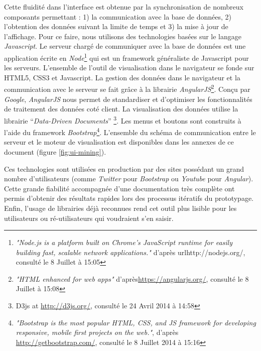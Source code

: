     Cette fluidité dans l'interface est obtenue par la  synchronisation de nombreux composants permettant : 1) la communication avec la base de données, 2) l'obtention des données suivant la limite de temps et 3) la mise à jour de l'affichage. Pour ce faire, nous utilisons des technologies basées sur le langage \textit{Javascript}. Le serveur chargé de communiquer avec la base de données est une application écrite en \textit{Node}\footnote{ \textit{"Node.js is a platform built on Chrome's JavaScript runtime for easily building fast, scalable network applications."} d'après url{http://nodejs.org/}, consulté le 8 Juillet à 15:05} qui est un framework généraliste de Javascript pour les serveurs. L{\textquoteright}ensemble de l{\textquoteright}outil de visualisation dans le navigateur se fonde sur HTML5, CSS3 et Javascript. La gestion des données dans le navigateur et la communication avec le serveur se fait grâce à la librairie \textit{AngularJS}\footnote{\textit{"HTML enhanced for web apps"} d'après\url{https://angularjs.org/}, consulté le 8 Juillet à 15:08}. Conçu par \textit{Google}, \textit{AngularJS} nous permet de standardiser et d'optimiser les fonctionnalités de traitement des données coté client. La visualisation des données utilise la librairie {\textquotedblleft}\textit{Data-Driven Documents}{\textquotedblright} \citep{Bostock2011}\footnote{ D3js at \url{http://d3js.org/,} consulté le 24 Avril 2014 à 14:58}. Les menus et boutons sont construits à l'aide du framework \textit{Bootstrap}\footnote{\textit{"Bootstrap is the most popular HTML, CSS, and JS framework for developing responsive, mobile first projects on the web."}, d'après \url{http://getbootstrap.com/}, consulté le 8 Juillet 2014 à 15:16}. L'ensemble du schéma de communication entre le serveur et le moteur de visualisation est disponibles dans les annexes de ce document (figure \ref{fig:ui-mining}).

    Ces technologies sont utilisées en production par des sites possédant un grand nombre d'utilisateurs (comme \textit{Twitter} pour \textit{Bootstrap} ou \textit{Youtube} pour \textit{Angular}). Cette grande fiabilité accompagnée d'une documentation très complète ont permis d'obtenir des résultats rapides lors des processus itératifs du prototypage. Enfin, l'usage de librairies déjà reconnues rend cet outil plus lisible pour les utilisateurs ou ré-utilisateurs qui voudraient s'en saisir.
